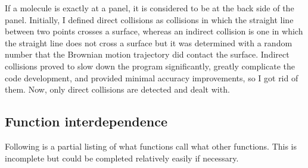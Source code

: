\documentclass {book}
\begin{document}
If a molecule is exactly at a panel, it is considered to be at the back side of the panel.  Initially, I defined direct collisions as collisions in which the straight line between two points crosses a surface, whereas an indirect collision is one in which the straight line does not cross a surface but it was determined with a random number that the Brownian motion trajectory did contact the surface.  Indirect collisions proved to slow down the program significantly, greatly complicate the code development, and provided minimal accuracy improvements, so I got rid of them.  Now, only direct collisions are detected and dealt with.\newline

\subsection*{Function interdependence}

Following is a partial listing of what functions call what other functions.  This is incomplete but could be completed relatively easily if necessary.
\end{document}
